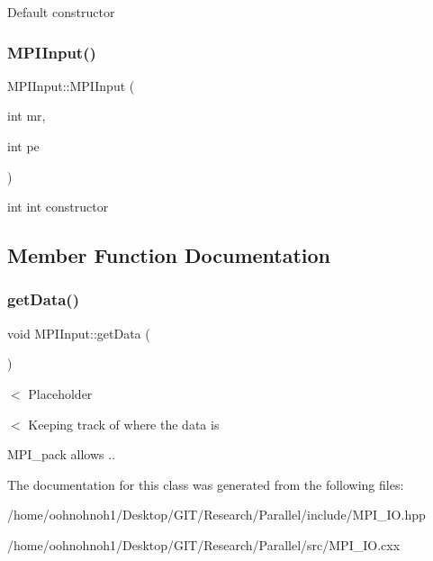 Default constructor \mbox{\label{classMPIInput_aad9097968754daede74b4e9931f58c8a}} 
\subsubsection{\texorpdfstring{M\+P\+I\+Input()}{MPIInput()}\hspace{0.1cm}{\footnotesize\ttfamily [2/2]}}
{\footnotesize\ttfamily M\+P\+I\+Input\+::\+M\+P\+I\+Input (\begin{DoxyParamCaption}\item[{int}]{mr,  }\item[{int}]{pe }\end{DoxyParamCaption})}

int int constructor 

\subsection{Member Function Documentation}
\mbox{\label{classMPIInput_ab573f01916c4e35072009b95602a1399}} 
\subsubsection{\texorpdfstring{get\+Data()}{getData()}}
{\footnotesize\ttfamily void M\+P\+I\+Input\+::get\+Data (\begin{DoxyParamCaption}{ }\end{DoxyParamCaption})}

$<$ Placeholder

$<$ Keeping track of where the data is

M\+P\+I\+\_\+pack allows ..

The documentation for this class was generated from the following files\+:\begin{DoxyCompactItemize}
\item 
/home/oohnohnoh1/\+Desktop/\+G\+I\+T/\+Research/\+Parallel/include/M\+P\+I\+\_\+\+I\+O.\+hpp\item 
/home/oohnohnoh1/\+Desktop/\+G\+I\+T/\+Research/\+Parallel/src/M\+P\+I\+\_\+\+I\+O.\+cxx\end{DoxyCompactItemize}
